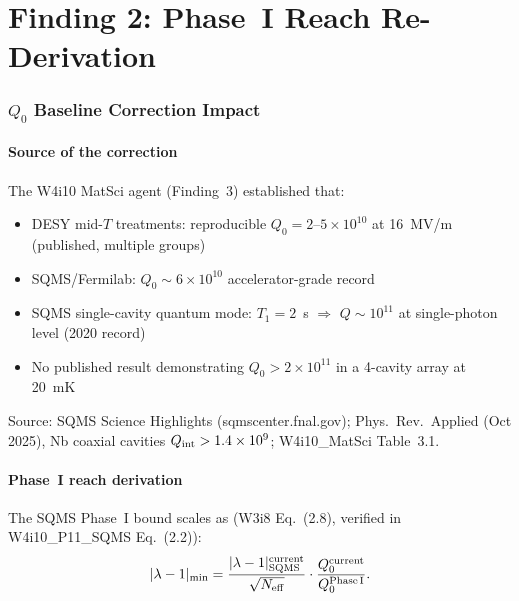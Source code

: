 \documentclass[11pt]{article}
\newcommand{\lbone}{|\lambda - 1|}
\newcommand{\ee}[1]{\times 10^{#1}}
\theoremstyle{definition}
\theoremstyle{remark}
\begin{document}
\part{Finding 2: Phase~I Reach Re-Derivation}
\label{part:phase_I}

\section{$Q_0$ Baseline Correction Impact}
\label{sec:q0_baseline}

\subsection{Source of the correction}

The W4i10 MatSci agent (Finding~3) established that:
\begin{itemize}[nosep]
\item DESY mid-$T$ treatments: reproducible $Q_0 = 2$--$5\ee{10}$
  at 16~MV/m (published, multiple groups)
\item SQMS/Fermilab: $Q_0 \sim 6\ee{10}$ accelerator-grade record
\item SQMS single-cavity quantum mode: $T_1 = 2$~s $\Rightarrow$
  $Q \sim 10^{11}$ at single-photon level (2020 record)
\item No published result demonstrating $Q_0 > 2\ee{11}$ in a
  4-cavity array at 20~mK
\end{itemize}

Source: SQMS Science Highlights (sqmscenter.fnal.gov); Phys.\ Rev.\
Applied (Oct 2025), Nb coaxial cavities $Q_{\rm int} > 1.4\ee{9}$;
W4i10\_MatSci Table~3.1.

\subsection{Phase~I reach derivation}

The SQMS Phase~I bound scales as (W3i8 Eq.~(2.8), verified in
W4i10\_P11\_SQMS Eq.~(2.2)):
\begin{equation}
\lbone_{\rm min} = \frac{\lbone^{\rm current}_{\rm SQMS}}{\sqrt{N_{\rm eff}}}
\cdot\frac{Q_0^{\rm current}}{Q_0^{\rm Phase\,I}}.
\label{eq:phase_I_scaling}
\end{equation}
\end{document}
